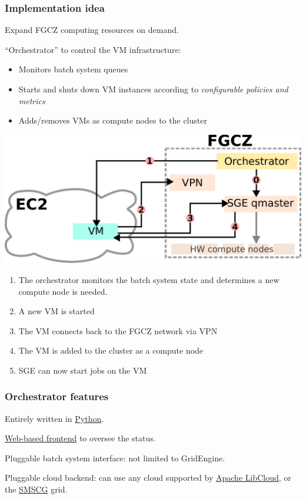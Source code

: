 \documentclass[english,serif,mathserif,xcolor=pdftex,dvipsnames,table]{beamer}
\begin{document}
\begin{frame}
  \frametitle{Implementation idea}
  Expand FGCZ computing resources on demand.
 
  \+
  ``Orchestrator'' to control the VM infrastructure:
  \begin{itemize}
  \item Monitors batch system queues
  \item Starts and shuts down VM instances according to \emph{configurable policies and metrics}
  \item Adds/removes VMs as compute nodes to the cluster
  \end{itemize}
\end{frame}


\begin{frame}
  \includegraphics[width=\linewidth]{fig/orchestrator}

  \+
  \begin{enumerate}
    \small
    \setcounter{enumi}{-1} 
  \item<1> The orchestrator monitors the batch system state and determines a new compute node is needed.
  \item<2> A new VM is started
  \item<3> The VM connects back to the FGCZ network via VPN
  \item<4> The VM is added to the cluster as a compute node
  \item<5> SGE can now start jobs on the VM
  \end{enumerate}
\end{frame}


\begin{frame}[label=features]
  \frametitle{Orchestrator features}
  Entirely written in \href{http://www.python.org}{Python}.

  \+
  \hyperlink{webapp}{Web-based frontend} to oversee the status.

  \+
  Pluggable batch system interface: not limited to GridEngine.

  \+ 
  Pluggable cloud backend: can use any cloud supported by
  \href{http://libcloud.apache.org}{Apache LibCloud}, or the
  \href{http://www.smscg.ch}{SMSCG} grid.
\end{frame}
\end{document}
